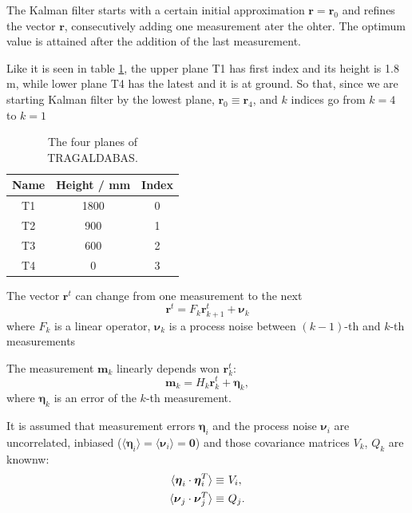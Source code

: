 \documentclass[a4paper]{book}
\let\vec\mathbf  %
\begin{document}
The Kalman filter starts with a certain initial approximation $\vec{r} = \vec{r}_0$ and refines the vector $\vec{r}$, consecutively adding one measurement ater the ohter. The optimum value is attained after the addition of the last measurement.

Like it is seen in table \ref{tb:planes}, the upper plane T1 has first index and its height is 1.8 m, while lower plane T4 has the latest and it is at ground. So that, since we are starting Kalman filter by the lowest plane, $\vec{r}_0 \equiv \vec{r}_4$, and $k$ indices go from $k=4$ to $k=1$

\begin{table}[h!]
\centering
\begin{tabular}{@{}ccc@{}}
\toprule
Name & Height / mm & Index \\ \midrule
T1   & 1800        & 0     \\
T2   & 900         & 1     \\
T3   & 600         & 2     \\
T4   & 0           & 3     \\ \bottomrule
\end{tabular}
\caption{The four planes of TRAGALDABAS.}
\label{tb:planes}
\end{table}

The vector $\vec{r}^t$ can change from one measurement to the next
\begin{equation}
\vec{r}^t = F_k \vec{r}^t_{k+1} + \boldsymbol\nu_k 
\label{eq:rtk}
\end{equation}
where $F_k$ is a linear operator, $\boldsymbol\nu_k$ is a process noise between $(k -1)$-th and $k$-th measurements

The measurement $\vec{m}_k$ linearly depends won $\vec{r}^t_k$:
\begin{equation}
\vec{m}_k = H_k \vec{r}^t_k + \boldsymbol\eta_k,
\label{eq:mk}
\end{equation}
where $\boldsymbol\eta_k$ is an error of the $k$-th measurement.

It is assumed that measurement errors $\boldsymbol\eta_i$ and the process noise $\boldsymbol\nu_i$ are uncorrelated, inbiased ($\langle \boldsymbol\eta_i \rangle = \langle \boldsymbol\nu_i \rangle   = \vec{0} $) and those covariance matrices $V_k$, $Q_k$ are knownw:
\begin{align}
\notag
\langle \boldsymbol\eta_i \cdot \boldsymbol\eta_i^T \rangle \equiv &\ V_i, \\
\langle \boldsymbol\nu_j \cdot \boldsymbol\nu_j^T \rangle \equiv &\ Q_j.
\label{eq:VQ}
\end{align}
\end{document}
